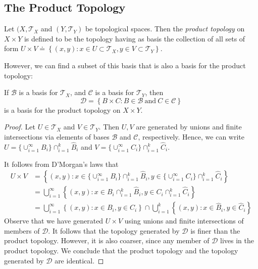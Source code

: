 \subsection{The Product Topology}
\begin{definition}
	\label{def:product_topology}
	Let $(X, \mathcal{T}_{X}$ and $(Y, \mathcal{T}_{Y})$ be topological spaces.
		Then the \emph{product topology} on $X \times Y$ is defined to be the
		topology having as basis the collection of all sets of form
		\(U \times V \doteq \left\{ (x,y): x \in U \subset
		\mathcal{T}_{X}, y \in V \subset \mathcal{T}_{Y}  \right\}\).
\end{definition}
However, we can find a subset of this basis that is also a basis for the product
topology:
\begin{theorem}
	\label{thm:product-basis}
	If $\mathcal{B}$ is a basis for $\mathcal{T}_{X}$, and
	$\mathcal{C}$ is a basis for $\mathcal{T}_{Y}$, then
	\begin{equation*}
		\mathcal{D} = \left\{ B \times C: B \in \mathcal{B} \ \text{and} \ C \in
		\mathcal{C} \right\}
	\end{equation*}
	is a basis for the product topology on $X \times Y$.
\end{theorem}
\begin{proof}
	Let $U \in \mathcal{T}_{X}$ and $V \in \mathcal{T}_{Y}$.
	Then $U, V$ are generated by unions and finite intersections via
	elements of bases $\mathcal{B}$ and $\mathcal{C}$, respectively.
	Hence, we can write
	$U = \{\cup_{i=1}^{\infty} B_{i}\} \cap_{i=1}^{k} \hat{B}_{i}$
	and $V = \{\cup_{i=1}^{\infty} C_{i}\} \cap_{i=1}^{k} \hat{C}_{i}$.

	It follows from D'Morgan's laws that
	\begin{align*}
		U \times V & = \left\{ (x,y): x \in \{\cup_{i=1}^{\infty} B_{i}\}
			\cap_{i=1}^{k} \hat{B}_{i}, y \in \{\cup_{i=1}^{\infty} C_{i}\} \cap_{i=1}^{k}
		\hat{C}_{i} \right\} \\
		& = \bigcup_{i=1}^{\infty} \left\{ (x,y): x \in B_{i} \cap_{i=1}^{k}
		\hat{B}_{i}, y \in C_{i} \cap_{i=1}^{k} \hat{C}_{i} \right\}\\
		& = \bigcup_{i=1}^{\infty} \left\{ (x,y): x \in B_{i}, y \in C_{i} \right \}
		\cap \bigcup_{i=1}^{k} \left \{ (x,y): x \in \hat{B}_{i}, y \in \hat{C}_{i}
		\right\}
	\end{align*}
	Observe that we have generated $U \times V$ using unions and finite
	intersections of members of $\mathcal{D}$. It follows that the topology
	generated by $\mathcal{D}$ is finer than the product topology.
	However, it is also coarser, since any member of $\mathcal{D}$ lives in the
	product topology. We conclude that the product topology and the topology
	generated by $\mathcal{D}$ are identical.
\end{proof}
